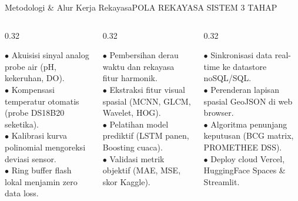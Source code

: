 \documentclass[aspectratio=169,11pt]{beamer}
\begin{document}
\begin{frame}{Metodologi \& Alur Kerja Rekayasa}{POLA REKAYASA SISTEM 3 TAHAP}
  \begin{columns}[t]
    \begin{column}{0.32\textwidth}
      \begin{tcolorbox}[colback=brandCardBg,colframe=brandBorder,arc=2mm,boxrule=0.6pt,boxsep=2pt,top=3pt,bottom=3pt,title={\footnotesize \bfseries \color{brandNavy} 01. Sensing \& Kalibrasi}]
        {\scriptsize \color{brandDark}
        $\bullet$ Akuisisi sinyal analog probe air (pH, kekeruhan, DO). \\
        $\bullet$ Kompensasi temperatur otomatis (probe DS18B20 seketika). \\
        $\bullet$ Kalibrasi kurva polinomial mengoreksi deviasi sensor. \\
        $\bullet$ Ring buffer flash lokal menjamin zero data loss.
        }
      \end{tcolorbox}
    \end{column}

    \begin{column}{0.32\textwidth}
      \begin{tcolorbox}[colback=brandCardBg,colframe=brandBorder,arc=2mm,boxrule=0.6pt,boxsep=2pt,top=3pt,bottom=3pt,title={\footnotesize \bfseries \color{brandNavy} 02. Preprocessing \& ML}]
        {\scriptsize \color{brandDark}
        $\bullet$ Pembersihan derau waktu dan rekayasa fitur harmonik. \\
        $\bullet$ Ekstraksi fitur visual spasial (MCNN, GLCM, Wavelet, HOG). \\
        $\bullet$ Pelatihan model prediktif (LSTM panen, Boosting cuaca). \\
        $\bullet$ Validasi metrik objektif (MAE, MSE, skor Kaggle).
        }
      \end{tcolorbox}
    \end{column}

    \begin{column}{0.32\textwidth}
      \begin{tcolorbox}[colback=brandCardBg,colframe=brandBorder,arc=2mm,boxrule=0.6pt,boxsep=2pt,top=3pt,bottom=3pt,title={\footnotesize \bfseries \color{brandNavy} 03. Deploy \& SPK}]
        {\scriptsize \color{brandDark}
        $\bullet$ Sinkronisasi data real-time ke datastore noSQL/SQL. \\
        $\bullet$ Perenderan lapisan spasial GeoJSON di web browser. \\
        $\bullet$ Algoritma penunjang keputusan (BCG matrix, PROMETHEE DSS). \\
        $\bullet$ Deploy cloud Vercel, HuggingFace Spaces \& Streamlit.
        }
      \end{tcolorbox}
    \end{column}
  \end{columns}
\end{frame}
\end{document}
